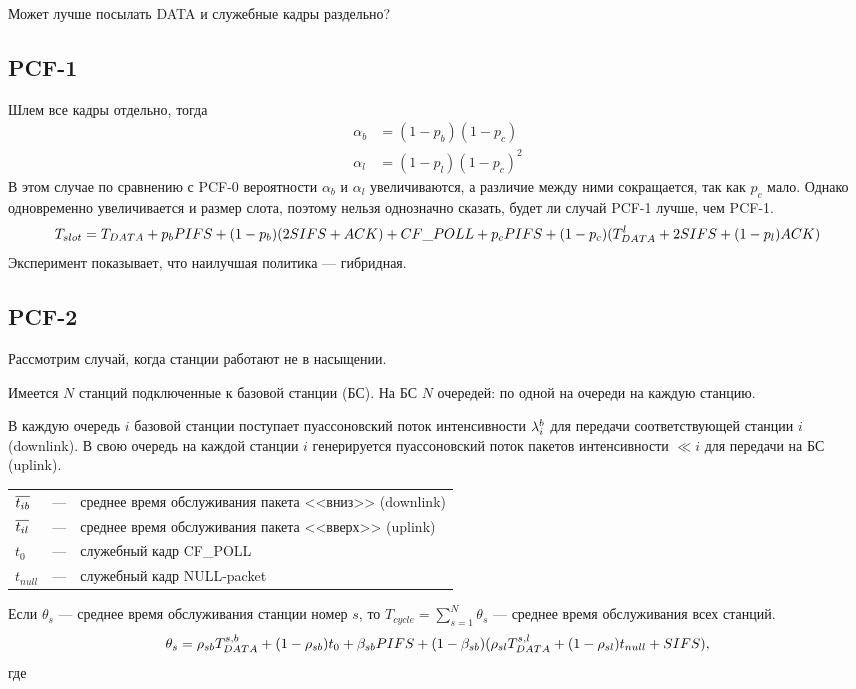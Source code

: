 Может лучше посылать DATA и служебные кадры раздельно?

\subsection{PCF-1}
Шлем все кадры отдельно, тогда 
\begin{align*}
\alpha_b &= (1-p_b)(1-p_c)\\
\alpha_l &= (1-p_l)(1-p_c)^2
\end{align*}
В этом случае по сравнению с PCF-0 вероятности $\alpha_b$ и $\alpha_l$ увеличиваются, а различие между ними сокращается, так как $p_c$ мало.
Однако одновременно увеличивается и размер слота, поэтому нельзя однозначно сказать, будет ли случай PCF-1 лучше, чем PCF-1.
\begin{equation}
\notag
T_{slot} = T_{DATA} + p_b PIFS + (1-p_b)(2SIFS + ACK) + CF\_POLL + p_c PIFS + (1-p_c)(T_{DATA}^l + 2SIFS + (1-p_l)ACK)
\end{equation}
Эксперимент показывает, что наилучшая политика --- гибридная.
\subsection{PCF-2}
Рассмотрим случай, когда станции работают не в насыщении.

Имеется $N$ станций подключенные к базовой станции (БС). На БС $N$ очередей: по одной на очереди на каждую станцию. 

В каждую очередь $i$ базовой станции поступает пуассоновский поток интенсивности $\lambda^{b}_{i}$ для передачи соответствующей станции $i$ (downlink). В свою очередь на каждой станции $i$ генерируется пуассоновский поток пакетов интенсивности $\ll{i}$ для передачи на БС (uplink). 

\begin{tabular}{l l l}
$\overline{t_{i b}}$ 	&---	&среднее время обслуживания пакета <<вниз>>  (downlink) \\
$\overline{t_{i l}}$	&---	&среднее время обслуживания пакета <<вверх>> (uplink)   \\
$t_0$		&---	&служебный кадр CF\_POLL \\
$t_{null}$	&--- 	&служебный кадр NULL-packet \\
\end{tabular}

Если $\theta_s$ --- среднее время обслуживания станции номер $s$, то 
$T_{cycle} = \sum\limits_{s = 1}^{N} \theta_s$ --- среднее время обслуживания всех станций.
\begin{equation}
\notag
\theta_s = \rho_{sb} T_{DATA}^{s,b} + (1 - \rho_{sb})t_0 + \beta_{sb} PIFS + (1-\beta_{sb})(\rho_{sl}T_{DATA}^{s,l} + (1- \rho_{sl})t_{null} + SIFS),
\end{equation}
где  

